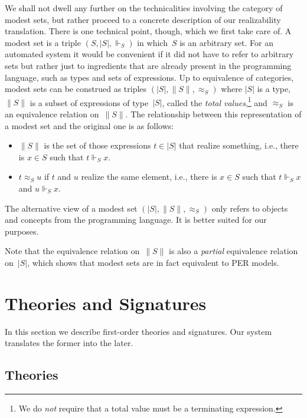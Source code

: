 \documentclass{article}
\newcommand{\ut}[1]{|#1|}
\newcommand{\tot}[1]{\|#1\|}
\newcommand{\per}[1]{\approx_{#1}}
\newcommand{\rz}{\Vdash}
\begin{document}
We shall not dwell any further on the technicalities involving the
category of modest sets, but rather proceed to a concrete description
of our realizability translation. There is one technical point,
though, which we first take care of. A modest set is a triple $(S,
\ut{S}, {\rz_S})$ in which~$S$ is an arbitrary set. For an automated
system it would be convenient if it did not have to refer to arbitrary
sets but rather just to ingredients that are already present in the
programming language, such as types and sets of expressions. Up to
equivalence of categories, modest sets can be construed as triples
$(\ut{S}, \tot{S}, {\per{S}})$ where $\ut{S}$ is a type, $\tot{S}$ is
a subset of expressions of type~$\ut{S}$, called the \emph{total
  values},\footnote{We do \emph{not} require that a total value must
  be a terminating expression.} and $\per{S}$ is an equivalence
relation on~$\tot{S}$. The relationship between this representation of
a modest set and the original one is as follows:
%
\begin{itemize}
\item $\tot{S}$ is the set of those expressions $t \in \ut{S}$ that
  realize something, i.e., there is $x \in S$ such that $t \rz_S x$.
\item $t \per{S} u$ if $t$ and $u$ realize the same element, i.e.,
  there is $x \in S$ such that $t \rz_S x$ and $u \rz_S x$.
\end{itemize}
%
The alternative view of a modest set $(\ut{S}, \tot{S}, {\per{S}})$
only refers to objects and concepts from the programming language. It
is better suited for our purposes.

Note that the equivalence relation on~$\tot{S}$ is also a
\emph{partial} equivalence relation on~$\ut{S}$, which shows that
modest sets are in fact equivalent to PER models.


\section{Theories and Signatures}
\label{sec:theories-signatures}

In this section we describe first-order theories and signatures.
Our system translates the former into the later.

\subsection{Theories}
\label{sec:theories}
\end{document}
